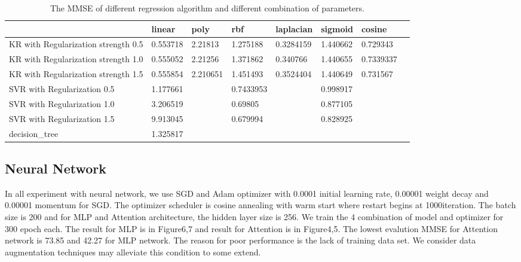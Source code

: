 \documentclass[final]{cvpr}
\begin{document}
\begin{table}[]
\begin{tabular}{|l|l|l|l|l|l|l|l|}
\hline
                                    & linear   & poly      & rbf       & laplacian & sigmoid  & cosine    \\ \hline
KR with Regularization strength 0.5 & 0.553718 & 2.21813   & 1.275188  & 0.3284159 & 1.440662 & 0.729343  \\ \hline
KR with Regularization strength 1.0 & 0.555052 & 2.21256   & 1.371862  & 0.340766  & 1.440655 & 0.7339337 \\ \hline
KR with Regularization strength 1.5 & 0.555854 & 2.210651  & 1.451493  & 0.3524404 & 1.440649 & 0.731567  \\ \hline
SVR with Regularization 0.5         & 1.177661 &           & 0.7433953 &           & 0.998917 &           \\ \hline
SVR with Regularization 1.0         & 3.206519 &           & 0.69805   &           & 0.877105 &           \\ \hline
SVR with Regularization 1.5         & 9.913045 &           & 0.679994  &           & 0.828925 &           \\ \hline
decision\_tree                      & 1.325817 &           &           &           &          &           \\ \hline
\end{tabular}
\caption{The MMSE of different regression algorithm and different combination of parameters.}
\label{tab:my-table23}
\end{table}






\subsection{Neural Network}
In all experiment with neural network, we use SGD and Adam optimizer with 0.0001 initial learning rate, 0.00001 weight decay and 0.00001 momentum for SGD. The optimizer scheduler is cosine annealing with warm start where restart begins at 1000iteration. The batch size is 200 and for MLP and Attention architecture, the hidden layer size is 256. We train the 4 combination of model and optimizer for 300 epoch each. The result for MLP is in Figure6,7 and result for Attention is in Figure4,5. The lowest evalution MMSE for Attention network is 73.85 and 42.27 for MLP network. The reason for poor performance is the lack of training data set. We consider data augmentation techniques may alleviate this condition to some extend.
\end{document}
